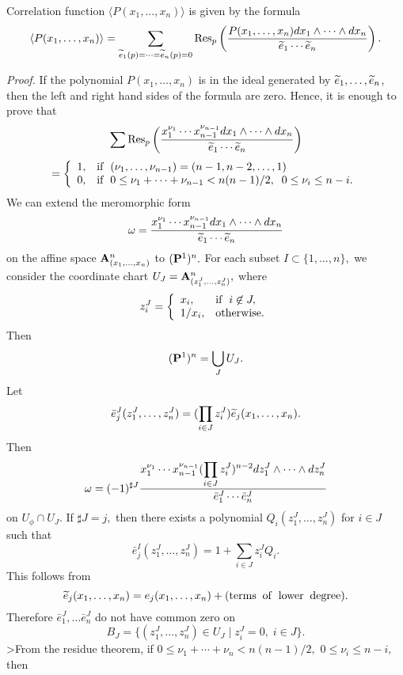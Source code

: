 {{\begin{th}\label{011} Correlation function 
$\langle P(x_1,\ldots ,x_n) \rangle$ is given by 
the formula 
\[ \langle P(x_1,\ldots ,x_n) \rangle = 
\sum_{{\widetilde e}_1(p)=\cdots ={\widetilde e}_{n}(p)=0}{\rm Res}_p 
\left( \frac{ P(x_1,\ldots ,x_n)
dx_1 \wedge \cdots \wedge dx_n }
{{\widetilde e}_1 \cdots {\widetilde e}_n} \right). \]
\end{th} 
{\it Proof.} If the polynomial $P(x_1,\ldots ,x_n)$ 
is in the ideal generated by ${\widetilde e}_1,\ldots ,{\widetilde e}_n$, 
then the left and right hand sides of the formula are
zero. Hence, it is enough to prove that
$$\sum{\rm Res}_p\left(\frac{x_1^{\nu_1}\cdots x_{n-1}^{\nu_{n-1}}dx_1
\wedge\cdots\wedge dx_n}{\widetilde e_1\cdots \widetilde e_n}\right)
$$
\[ = \left\{
\begin{array}{ll}
1, & {\rm if}\; \;(\nu_1,\ldots ,\nu_{n-1})
= (n-1,n-2,\ldots,1) \\ 
0, & {\rm if}\; \; 0\le \nu_1+\cdots + \nu_{n-1} < 
n(n-1)/2, \; \; 0\leq \nu_i \leq n-i.
\end{array} 
\right. \] 
We can extend the meromorphic form 
\[ \omega = \frac{ x_1^{\nu_1}\cdots x_{n-1}^{\nu_{n-1}}
dx_1 \wedge \cdots \wedge dx_n }
{{\widetilde e}_1 \cdots {\widetilde e}_n} \] 
on the affine space ${\bf A}^{n}_{(x_1,\ldots ,x_n)}$ 
to $({\bf P}^1)^n.$ 
For each subset $I \subset \{ 1,\ldots,n \} ,$ 
we consider the coordinate chart $U_J = 
{\bf A}^{n}_{(z_1^J,\ldots ,z_n^J)},$ where 
\[ z_i^J = \left\{ 
\begin{array}{ll} 
x_i, & {\rm if}\; \; i \not\in J, \\ 
1/x_i, & {\rm otherwise.} 
\end{array} 
\right. \] 
Then 
\[ ({\bf P}^1)^n = \bigcup_{J} U_J. \] 
Let 
\[ \bar{e}_j^J(z_1^J,\ldots ,z_n^J) = 
(\prod_{i\in J} z_i^J) {\widetilde e}_j(x_1,\ldots ,x_n) . \] 
Then 
\[ \omega = (-1)^{\sharp J} 
\frac{x_1^{\nu_1}\cdots x_{n-1}^{\nu_{n-1}}
\displaystyle(\prod_{i\in J}z_i^J)^{n-2}dz_1^J
\wedge \cdots \wedge dz_n^J}
{\bar{e}_1^J \cdots \bar{e}_n^J } \] 
on $U_{\phi}\cap U_J.$ 
If $\sharp J = j,$ then there exists a polynomial 
$Q_i(z_1^J,\ldots ,z_n^J)$ for $i\in J$ 
such that 
\[ \bar{e}_j^I(z_1^J,\ldots ,z_n^J) = 
1+\sum_{i\in J}z_i^J Q_i. \] 
This follows from 
\[ {\widetilde e}_j(x_1,\ldots ,x_n) = e_j(x_1,\ldots ,x_n) +
({\rm terms} \; \; {\rm of} \;\; {\rm lower} \; \; 
{\rm degree}). \] 
Therefore $\bar{e}_1^J,\ldots \bar{e}_n^J$ 
do not have common zero on 
\[ B_J = \{ (z_1^J,\ldots ,z_n^J) \in U_J \mid 
 z_i^J = 0 , \; i\in J \}. \] 
>From the residue theorem, if 
$0\leq \nu_1+\cdots + \nu_n < n(n-1)/2,$ 
$0\leq \nu_i \leq n-i,$ then 
}}

